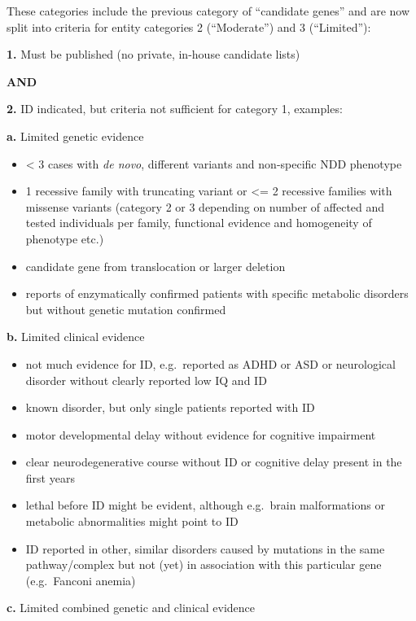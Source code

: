 \documentclass[
]{article}
\providecommand{\tightlist}{%
  \setlength{\itemsep}{0pt}\setlength{\parskip}{0pt}}
\begin{document}
These categories include the previous category of ``candidate genes'' and are now split into criteria for entity categories 2 (``Moderate'') and 3 (``Limited''):

\textbf{1.} Must be published (no private, in-house candidate lists)

\textbf{AND}

\textbf{2.} ID indicated, but criteria not sufficient for category 1, examples:

\textbf{a.} Limited genetic evidence

\begin{itemize}
\tightlist
\item
  \textless{} 3 cases with \emph{de novo}, different variants and non-specific NDD phenotype
\item
  1 recessive family with truncating variant or \textless= 2 recessive families with missense variants (category 2 or 3 depending on number of affected and tested individuals per family, functional evidence and homogeneity of phenotype etc.)
\item
  candidate gene from translocation or larger deletion
\item
  reports of enzymatically confirmed patients with specific metabolic disorders but without genetic mutation confirmed
\end{itemize}

\textbf{b.} Limited clinical evidence

\begin{itemize}
\tightlist
\item
  not much evidence for ID, e.g.~reported as ADHD or ASD or neurological disorder without clearly reported low IQ and ID
\item
  known disorder, but only single patients reported with ID
\item
  motor developmental delay without evidence for cognitive impairment
\item
  clear neurodegenerative course without ID or cognitive delay present in the first years
\item
  lethal before ID might be evident, although e.g.~brain malformations or metabolic abnormalities might point to ID
\item
  ID reported in other, similar disorders caused by mutations in the same pathway/complex but not (yet) in association with this particular gene (e.g.~Fanconi anemia)
\end{itemize}

\textbf{c.} Limited combined genetic and clinical evidence
\end{document}
